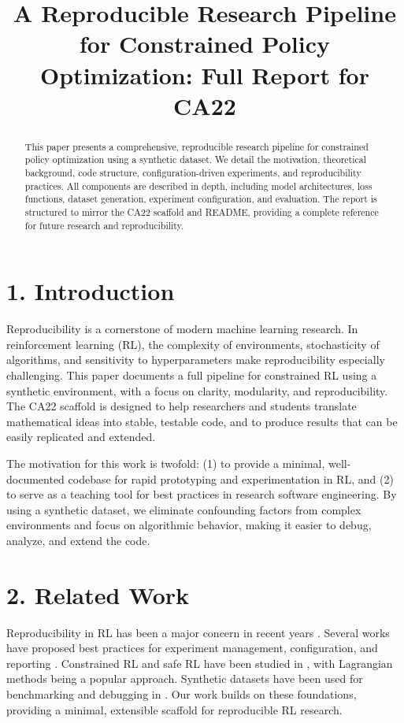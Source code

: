 \documentclass[conference]{IEEEtran}
\title{A Reproducible Research Pipeline for Constrained Policy Optimization: Full Report for CA22}
\author{\IEEEauthorblockN{Your Name(s)}
\IEEEauthorblockA{Affiliation \\ Email}}
\begin{document}
\maketitle


\begin{abstract}
This paper presents a comprehensive, reproducible research pipeline for constrained policy optimization using a synthetic dataset. We detail the motivation, theoretical background, code structure, configuration-driven experiments, and reproducibility practices. All components are described in depth, including model architectures, loss functions, dataset generation, experiment configuration, and evaluation. The report is structured to mirror the CA22 scaffold and README, providing a complete reference for future research and reproducibility.
\end{abstract}

\section*{1. Introduction}
Reproducibility is a cornerstone of modern machine learning research. In reinforcement learning (RL), the complexity of environments, stochasticity of algorithms, and sensitivity to hyperparameters make reproducibility especially challenging. This paper documents a full pipeline for constrained RL using a synthetic environment, with a focus on clarity, modularity, and reproducibility. The CA22 scaffold is designed to help researchers and students translate mathematical ideas into stable, testable code, and to produce results that can be easily replicated and extended.

The motivation for this work is twofold: (1) to provide a minimal, well-documented codebase for rapid prototyping and experimentation in RL, and (2) to serve as a teaching tool for best practices in research software engineering. By using a synthetic dataset, we eliminate confounding factors from complex environments and focus on algorithmic behavior, making it easier to debug, analyze, and extend the code.

\section*{2. Related Work}
Reproducibility in RL has been a major concern in recent years \cite{Henderson2018}. Several works have proposed best practices for experiment management, configuration, and reporting \cite{Pineau2021}. Constrained RL and safe RL have been studied in \cite{Achiam2017, Chow2018}, with Lagrangian methods being a popular approach. Synthetic datasets have been used for benchmarking and debugging in \cite{Duan2016, Brockman2016}. Our work builds on these foundations, providing a minimal, extensible scaffold for reproducible RL research.
\end{document}
